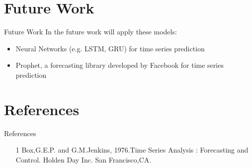\documentclass{beamer}
\begin{document}
\section{Future Work}

\begin{frame}{Future Work}
In the future work will apply these models:
\begin{itemize}
\item Neural Networks (e.g. LSTM, GRU) for time series prediction
\item Prophet, a forecasting library developed by Facebook for time series prediction
\end{itemize}
\end{frame}

\section{References}
\begin{frame}{References}
\begin{itemize}
\item [1] Box,G.E.P. and G.M.Jenkins, 1976.Time Series Analysis : Forecasting and Control. Holden Day Inc. San
Francisco,CA.
\end{itemize}

\end{frame}
\end{document}

